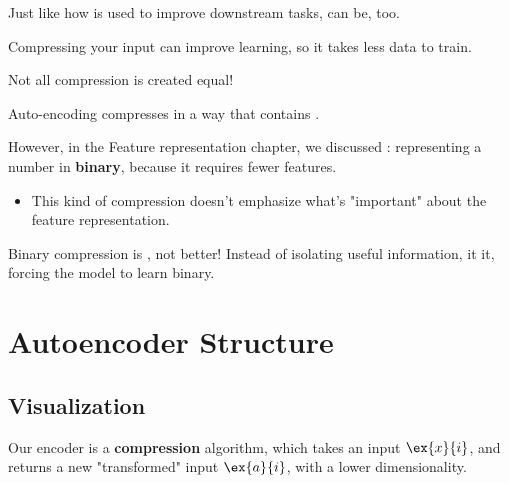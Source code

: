             \begin{concept}
                Just like how  is used to improve downstream tasks,  can be, too.

                Compressing your input can improve learning, so it takes less data to train.
            \end{concept}

            \phantom{}

            \begin{clarification}
                Not all compression is created equal!

                Auto-encoding compresses in a way that contains .

                \subsecdiv

                However, in the Feature representation chapter, we discussed : representing a number in \textbf{binary}, because it requires fewer features.

                \begin{itemize}
                    \item This kind of compression doesn't emphasize what's "important" about the feature representation.
                \end{itemize}

                Binary compression is , not better! Instead of isolating useful information, it  it, forcing the model to learn binary.
            \end{clarification}


        


\pagebreak
\section{Autoencoder Structure}

    \subsection{Visualization}

        Our encoder is a \textbf{compression} algorithm, which takes an input $\ex{x}{i}$, and returns a new "transformed" input $\ex{a}{i}$, with a lower dimensionality.
    
